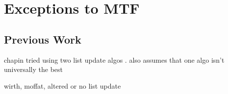 \documentclass[a4paper]{scrreprt}
\begin{document}
\chapter{Exceptions to MTF}

\section{Previous Work}

chapin tried using two list update algos
\cite{chapin2000switching,chapin2001diss}. also assumes that one algo isn't
universally the best

wirth, moffat, altered or no list update \cite{wirth2001ranks}



\end{document}
